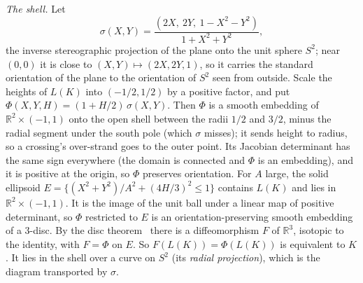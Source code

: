 \documentclass[11pt]{article}
\theoremstyle{plain}
\theoremstyle{definition}
\theoremstyle{remark}
\newcommand{\R}{\mathbb{R}}
\begin{document}
\begin{enumerate}
\emph{The shell.} Let
\[ \sigma(X,Y)=\frac{(2X,\ 2Y,\ 1-X^2-Y^2)}{1+X^2+Y^2}, \]
the inverse stereographic projection of the plane onto the unit sphere $S^2$; near $(0,0)$ it is close to $(X,Y)\mapsto(2X,2Y,1)$, so it carries the
standard orientation of the plane to the orientation of $S^2$ seen from outside. Scale the heights of
$L(K)$ into $(-1/2,1/2)$ by a positive factor, and put $\Phi(X,Y,H)=(1+H/2)\,\sigma(X,Y)$. Then $\Phi$ is a
smooth embedding of $\R^2\times(-1,1)$ onto the open shell between the radii $1/2$ and $3/2$, minus the
radial segment under the south pole (which $\sigma$ misses); it sends height to radius, so a crossing's
over-strand goes to the outer point. Its Jacobian determinant has the same sign
everywhere (the domain is connected and $\Phi$ is an embedding), and it is positive at the origin, so
$\Phi$ preserves orientation. For $A$ large, the solid ellipsoid
$E=\{(X^2+Y^2)/A^2+(4H/3)^2\le1\}$ contains $L(K)$ and lies in $\R^2\times(-1,1)$. It is the image of
the unit ball under a linear map of positive determinant, so $\Phi$ restricted to $E$ is an
orientation-preserving smooth embedding of a $3$-disc. By the disc theorem~\cite[Ch.~8]{Hir76} there
is a diffeomorphism $F$ of $\R^3$, isotopic to the identity, with $F=\Phi$ on $E$. So $F(L(K))=\Phi(L(K))$
is equivalent to $K$. It lies in the shell over a
curve on $S^2$ (its \emph{radial projection}), which is the diagram transported by $\sigma$.


\end{enumerate}
\end{document}
